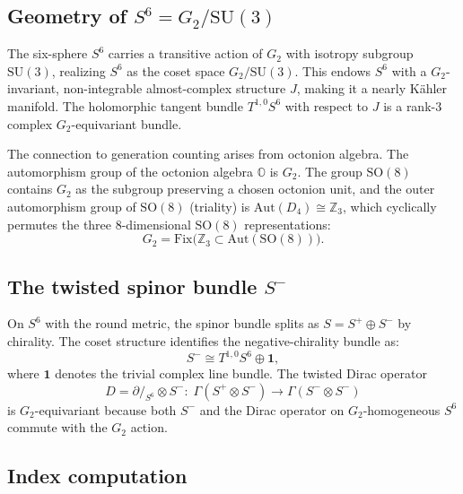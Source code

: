 \documentclass[12pt,a4paper]{article}
\newcommand{\OC}{\mathbb{O}}    %
\newcommand{\ZZ}{\mathbb{Z}}
\newcommand{\Dslash}{\partial\!\!\!/}
\begin{document}
\subsection{Geometry of \texorpdfstring{$S^6 = G_2/\mathrm{SU}(3)$}{S6=G2/SU(3)}}
\label{sec:geom-S6}

The six-sphere $S^6$ carries a transitive action of $G_2$ with isotropy subgroup
$\mathrm{SU}(3)$, realizing $S^6$ as the coset space $G_2/\mathrm{SU}(3)$. This
endows $S^6$ with a $G_2$-invariant, non-integrable almost-complex structure $J$,
making it a nearly K\"ahler manifold. The holomorphic tangent bundle $T^{1,0}S^6$
with respect to $J$ is a rank-3 complex $G_2$-equivariant bundle.

The connection to generation counting arises from octonion algebra. The automorphism
group of the octonion algebra $\OC$ is $G_2$. The group $\mathrm{SO}(8)$ contains $G_2$
as the subgroup preserving a chosen octonion unit, and the outer automorphism group of
$\mathrm{SO}(8)$ (triality) is $\mathrm{Aut}(D_4)\cong\ZZ_3$, which cyclically permutes
the three 8-dimensional $\mathrm{SO}(8)$ representations:
\begin{equation}
  G_2 = \mathrm{Fix}\bigl(\ZZ_3\subset\mathrm{Aut}(\mathrm{SO}(8))\bigr).
  \tag{Lemma L1a}
\end{equation}

\subsection{The twisted spinor bundle \texorpdfstring{$S^-$}{S-}}
\label{sec:Sminus}

On $S^6$ with the round metric, the spinor bundle splits as $S=S^+\oplus S^-$ by
chirality. The coset structure identifies the negative-chirality bundle as:
\begin{equation}
  S^- \cong T^{1,0}S^6\oplus\mathbf{1},
  \tag{Lemma L1}
\end{equation}
where $\mathbf{1}$ denotes the trivial complex line bundle. The twisted Dirac operator
\begin{equation}
  D = \Dslash_{S^6}\otimes S^-:\; \Gamma(S^+\otimes S^-)\to\Gamma(S^-\otimes S^-)
\end{equation}
is $G_2$-equivariant because both $S^-$ and the Dirac operator on $G_2$-homogeneous
$S^6$ commute with the $G_2$ action.

\subsection{Index computation}
\label{sec:index}
\end{document}
